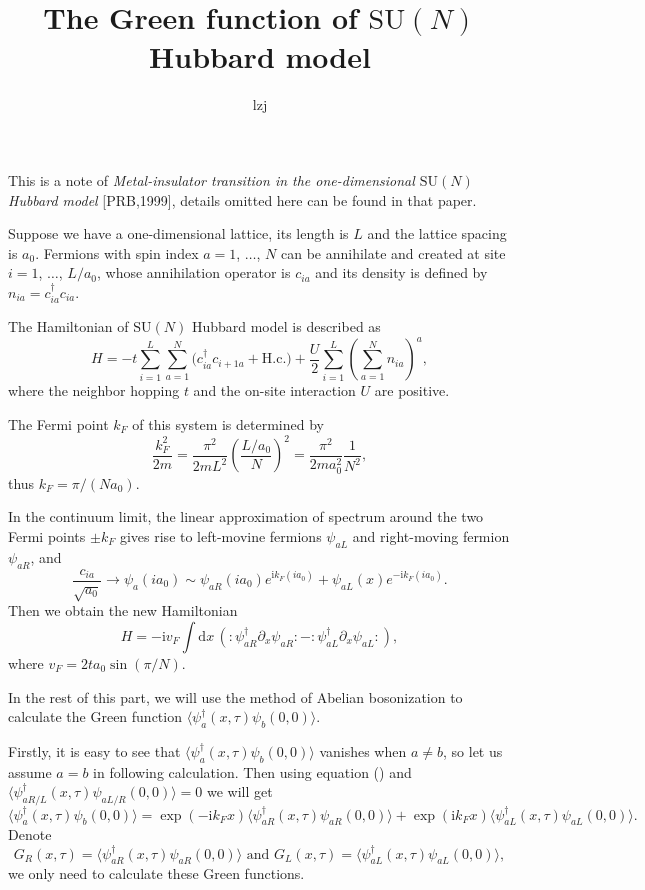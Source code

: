 \documentclass[10pt]{extarticle}
\title{The Green function of $\mathrm{SU}(N)$ Hubbard model}
\author{lzj}
\newcommand{\dd}{\mathrm{d}}
\newcommand{\ii}{\mathrm{i}}
\begin{document}
\maketitle

This is a note of \textit{Metal-insulator transition in the one-dimensional $\mathrm{SU}(N)$ Hubbard model} [PRB,1999], details omitted here can be found in that paper.

Suppose we have a one-dimensional lattice, its length is $L$ and the lattice spacing is $a_0$. Fermions with spin index $a=1$, $\dots$, $N$ can be annihilate and created at site $i=1$, $\dots$, $L/a_0$, whose annihilation operator is $c_{ia}$ and its density is defined by $n_{ia}=c_{ia}^\dag c_{ia}$.

The Hamiltonian of $\mathrm{SU}(N)$ Hubbard model is described as
\[
	H=-t\sum_{i=1}^L\sum_{a=1}^N\bigl(c_{ia}^\dag c_{i+1a}+\text{H.c.}\bigr)+\frac{U}{2}\sum_{i=1}^L\left(\sum_{a=1}^N n_{ia}\right)^a,
\]
where the neighbor hopping $t$ and the on-site interaction $U$ are positive.

The Fermi point $k_F$ of this system is determined by
\[
	\frac{k_F^2}{2m}=\frac{\pi^2}{2mL^2}\left(\frac{L/a_0}{N}\right)^2=\frac{\pi^2}{2ma_0^2}\frac{1}{N^2},
\]
thus $k_F=\pi/(Na_0)$.

In the continuum limit, the linear approximation of spectrum around the two Fermi points $\pm k_F$ gives rise to left-movine fermions $\psi_{aL}$ and right-moving fermion $\psi_{aR}$, and
\begin{equation}
	\frac{c_{ia}}{\sqrt{a_0}}\to \psi_a(ia_0)\sim \psi_{aR}(ia_0)e^{\ii k_F (ia_0)}+\psi_{aL}(x)e^{-\ii k_F (ia_0)}.
\end{equation}
Then we obtain the new Hamiltonian
\[
	H=-\ii v_F \int \dd x \,\left(:\psi_{aR}^\dag \partial_x \psi_{aR}:-:\psi_{aL}^\dag \partial_x \psi_{aL}:\right),
\]
where $v_F=2 t a_0 \sin(\pi /N)$.

In the rest of this part, we will use the method of Abelian bosonization to calculate the Green function $\langle \psi_a^\dag(x,\tau)\psi_b(0,0)\rangle$. 

Firstly, it is easy to see that $\langle \psi_a^\dag(x,\tau)\psi_b(0,0)\rangle$ vanishes when $a\neq b$, so let us assume $a=b$ in following calculation. Then using equation (\theequation) and $\langle \psi_{aR/L}^\dag(x,\tau)\psi_{aL/R}(0,0)\rangle = 0$ we will get
\[
	\langle \psi_a^\dag(x,\tau)\psi_b(0,0)\rangle=\exp(-\ii k_Fx)\langle \psi_{aR}^\dag(x,\tau)\psi_{aR}(0,0)\rangle+\exp(\ii k_Fx)\langle \psi_{aL}^\dag(x,\tau)\psi_{aL}(0,0)\rangle.
\]
Denote
\[
	G_R(x,\tau)=\langle \psi_{aR}^\dag(x,\tau)\psi_{aR}(0,0)\rangle\text{ and }G_L(x,\tau)=\langle \psi_{aL}^\dag(x,\tau)\psi_{aL}(0,0)\rangle,
\]
we only need to calculate these Green functions.
\end{document}

